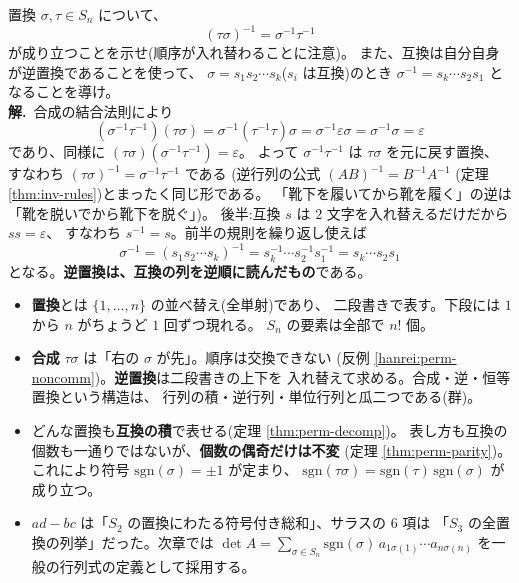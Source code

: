 \begin{rei}[例題・標準(証明:合成の逆置換)]\label{rei:perm-invorder}
置換 $\sigma, \tau \in S_n$ について、
\[
(\tau\sigma)^{-1} = \sigma^{-1}\tau^{-1}
\]
が成り立つことを示せ(順序が入れ替わることに注意)。
また、互換は自分自身が逆置換であることを使って、
$\sigma = s_1 s_2 \cdots s_k$($s_i$ は互換)のとき
$\sigma^{-1} = s_k \cdots s_2 s_1$ となることを導け。\\
\textbf{解.}\ 合成の結合法則により
\[
(\sigma^{-1}\tau^{-1})(\tau\sigma)
= \sigma^{-1}(\tau^{-1}\tau)\sigma = \sigma^{-1}\varepsilon\sigma
= \sigma^{-1}\sigma = \varepsilon
\]
であり、同様に $(\tau\sigma)(\sigma^{-1}\tau^{-1}) = \varepsilon$。
よって $\sigma^{-1}\tau^{-1}$ は $\tau\sigma$ を元に戻す置換、
すなわち $(\tau\sigma)^{-1} = \sigma^{-1}\tau^{-1}$ である
(逆行列の公式 $(AB)^{-1} = B^{-1}A^{-1}$
(定理 \ref{thm:inv-rules})とまったく同じ形である。
「靴下を履いてから靴を履く」の逆は「靴を脱いでから靴下を脱ぐ」)。
後半:互換 $s$ は $2$ 文字を入れ替えるだけだから $ss = \varepsilon$、
すなわち $s^{-1} = s$。前半の規則を繰り返し使えば
\[
\sigma^{-1} = (s_1 s_2 \cdots s_k)^{-1}
= s_k^{-1} \cdots s_2^{-1} s_1^{-1} = s_k \cdots s_2 s_1
\]
となる。\textbf{逆置換は、互換の列を逆順に読んだもの}である。
\end{rei}

\begin{matome}
\begin{itemize}
\item \textbf{置換}とは $\{1, \dots, n\}$ の並べ替え(全単射)であり、
二段書きで表す。下段には $1$ から $n$ がちょうど $1$ 回ずつ現れる。
$S_n$ の要素は全部で $n!$ 個。
\item \textbf{合成} $\tau\sigma$ は「右の $\sigma$ が先」。順序は交換できない
(反例 \ref{hanrei:perm-noncomm})。\textbf{逆置換}は二段書きの上下を
入れ替えて求める。合成・逆・恒等置換という構造は、
行列の積・逆行列・単位行列と瓜二つである(群)。
\item どんな置換も\textbf{互換の積}で表せる(定理 \ref{thm:perm-decomp})。
表し方も互換の個数も一通りではないが、\textbf{個数の偶奇だけは不変}
(定理 \ref{thm:perm-parity})。これにより符号
$\mathrm{sgn}(\sigma) = \pm 1$ が定まり、
$\mathrm{sgn}(\tau\sigma) = \mathrm{sgn}(\tau)\,\mathrm{sgn}(\sigma)$ が成り立つ。
\item $ad - bc$ は「$S_2$ の置換にわたる符号付き総和」、サラスの $6$ 項は
「$S_3$ の全置換の列挙」だった。次章では
$\det A = \sum_{\sigma \in S_n} \mathrm{sgn}(\sigma)\,
a_{1\sigma(1)} \cdots a_{n\sigma(n)}$ を一般の行列式の定義として採用する。
\end{itemize}
\end{matome}

